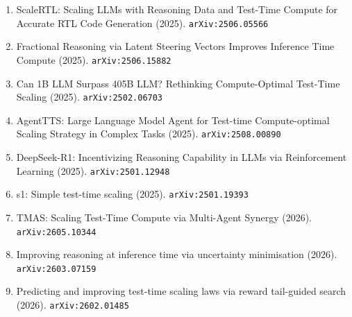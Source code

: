 \documentclass[11pt]{article}
\begin{document}
\begin{enumerate}
  \item ScaleRTL: Scaling LLMs with Reasoning Data and Test-Time Compute for Accurate RTL Code Generation (2025). \texttt{arXiv:2506.05566}
  \item Fractional Reasoning via Latent Steering Vectors Improves Inference Time Compute (2025). \texttt{arXiv:2506.15882}
  \item Can 1B LLM Surpass 405B LLM? Rethinking Compute-Optimal Test-Time
  Scaling (2025). \texttt{arXiv:2502.06703}
  \item AgentTTS: Large Language Model Agent for Test-time Compute-optimal Scaling Strategy in Complex Tasks (2025). \texttt{arXiv:2508.00890}
  \item DeepSeek-R1: Incentivizing Reasoning Capability in LLMs via Reinforcement Learning (2025). \texttt{arXiv:2501.12948}
  \item s1: Simple test-time scaling (2025). \texttt{arXiv:2501.19393}
  \item TMAS: Scaling Test-Time Compute via Multi-Agent Synergy (2026). \texttt{arXiv:2605.10344}
  \item Improving reasoning at inference time via uncertainty minimisation (2026). \texttt{arXiv:2603.07159}
  \item Predicting and improving test-time scaling laws via reward tail-guided search (2026). \texttt{arXiv:2602.01485}
\end{enumerate}
\end{document}
